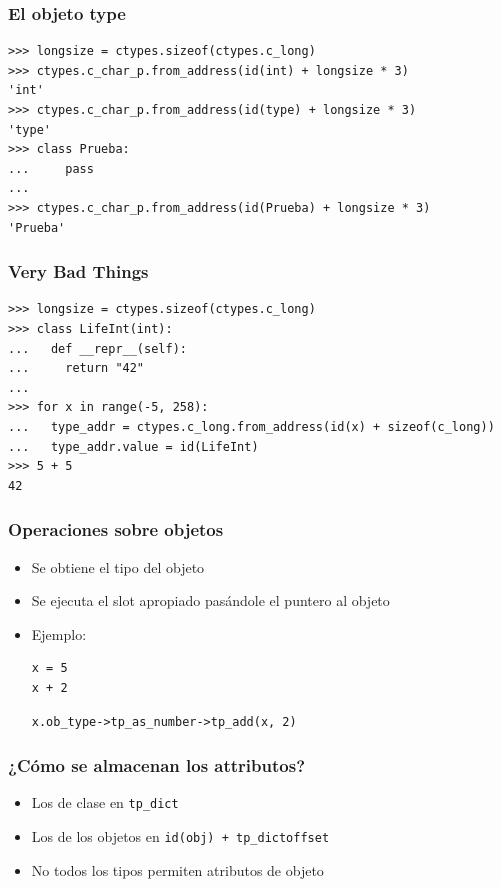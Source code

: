 \documentclass[10pt]{beamer}
\begin{document}
  \begin{frame}[containsverbatim]
    \frametitle{El objeto type}
    \begin{verbatim}
>>> longsize = ctypes.sizeof(ctypes.c_long)
>>> ctypes.c_char_p.from_address(id(int) + longsize * 3)
'int'
>>> ctypes.c_char_p.from_address(id(type) + longsize * 3)
'type'
>>> class Prueba:
...     pass
...
>>> ctypes.c_char_p.from_address(id(Prueba) + longsize * 3)
'Prueba'
    \end{verbatim}
  \end{frame}

  \begin{frame}[containsverbatim]
    \frametitle{Very Bad Things}
    \begin{verbatim}
>>> longsize = ctypes.sizeof(ctypes.c_long)
>>> class LifeInt(int):
...   def __repr__(self):
...     return "42"
...
>>> for x in range(-5, 258):
...   type_addr = ctypes.c_long.from_address(id(x) + sizeof(c_long))
...   type_addr.value = id(LifeInt)
>>> 5 + 5
42
    \end{verbatim}
  \end{frame}

  \begin{frame}[containsverbatim]
    \frametitle{Operaciones sobre objetos}
    \begin{itemize}
      \item Se obtiene el tipo del objeto
      \item Se ejecuta el slot apropiado pasándole el puntero al objeto
      \item Ejemplo:
        \begin{verbatim}
x = 5
x + 2
        \end{verbatim}
        \begin{verbatim}
x.ob_type->tp_as_number->tp_add(x, 2)
        \end{verbatim}
    \end{itemize}
  \end{frame}

  \begin{frame}[containsverbatim]
    \frametitle{¿Cómo se almacenan los attributos?}
    \begin{itemize}
      \item Los de clase en \verb+tp_dict+
      \item Los de los objetos en \verb/id(obj) + tp_dictoffset/
      \item No todos los tipos permiten atributos de objeto
    \end{itemize}
  \end{frame}
\end{document}
